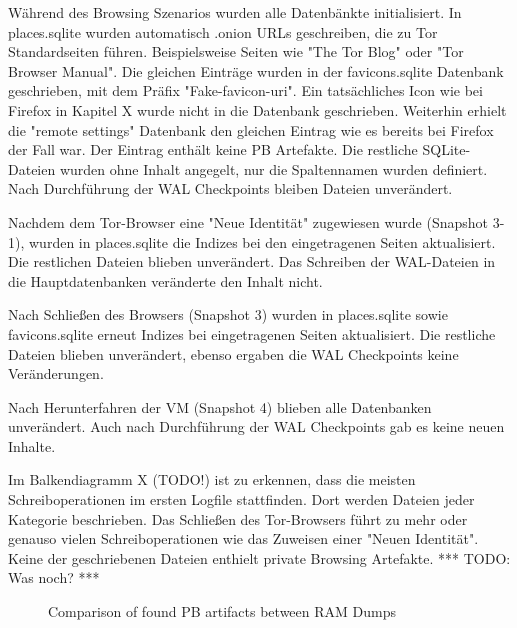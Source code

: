 \begin{appendices}
Während des Browsing Szenarios wurden alle Datenbänkte initialisiert.
In places.sqlite wurden automatisch .onion URLs geschreiben, die zu Tor Standardseiten führen. Beispielsweise Seiten wie "The Tor Blog" oder "Tor Browser Manual".
Die gleichen Einträge wurden in der favicons.sqlite Datenbank geschrieben, mit dem Präfix "Fake-favicon-uri". Ein tatsächliches Icon wie bei Firefox in Kapitel X wurde nicht in die Datenbank geschrieben. 
Weiterhin erhielt die "remote settings" Datenbank den gleichen Eintrag wie es bereits bei Firefox der Fall war. Der Eintrag enthält keine PB Artefakte.
Die restliche SQLite-Dateien wurden ohne Inhalt angegelt, nur die Spaltennamen wurden definiert.
Nach Durchführung der WAL Checkpoints bleiben Dateien unverändert.

Nachdem dem Tor-Browser eine "Neue Identität" zugewiesen wurde (Snapshot 3-1), wurden in places.sqlite die Indizes bei den eingetragenen Seiten aktualisiert. Die restlichen Dateien blieben unverändert. Das Schreiben der WAL-Dateien in die Hauptdatenbanken veränderte den Inhalt nicht.

Nach Schließen des Browsers (Snapshot 3) wurden in places.sqlite sowie favicons.sqlite erneut Indizes bei eingetragenen Seiten aktualisiert. Die restliche Dateien blieben unverändert, ebenso ergaben die WAL Checkpoints keine Veränderungen.

Nach Herunterfahren der VM (Snapshot 4) blieben alle Datenbanken unverändert. Auch nach Durchführung der WAL Checkpoints gab es keine neuen Inhalte.

Im Balkendiagramm X (TODO!) ist zu erkennen, dass die meisten Schreiboperationen im ersten Logfile stattfinden. Dort werden Dateien jeder Kategorie beschrieben. Das Schließen des Tor-Browsers führt zu mehr oder genauso vielen Schreiboperationen wie das Zuweisen einer "Neuen Identität". Keine der geschriebenen Dateien enthielt private Browsing Artefakte.
*** TODO: Was noch? ***
	\begin{figure}[h!]
		\centerline{}
		\label{chart:final-criteria}  
		\caption{Comparison of found PB artifacts between RAM Dumps}
	\end{figure}


\end{appendices}
